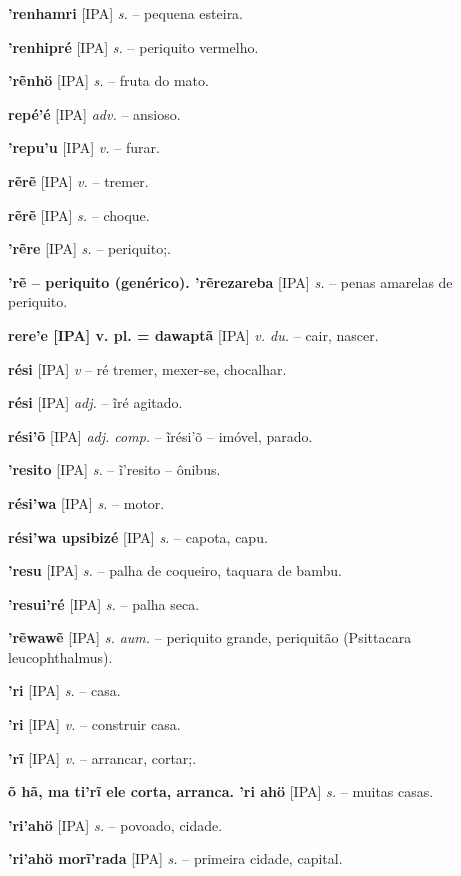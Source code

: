 \textbf{'renhamri} [IPA] \textit{s.} -- pequena esteira.

\textbf{'renhipré} [IPA] \textit{s.} -- periquito vermelho.

\textbf{'rẽnhö} [IPA] \textit{s.} -- fruta do mato.

\textbf{repé'é} [IPA] \textit{adv.} -- ansioso.

\textbf{'repu'u} [IPA] \textit{v.} -- furar.

\textbf{rẽrẽ} [IPA] \textit{v.} -- tremer.

\textbf{rẽrẽ} [IPA] \textit{s.} -- choque.

\textbf{'rẽre} [IPA] \textit{s.} -- periquito;.

\textbf{'rẽ -- periquito (genérico). 'rẽrezareba} [IPA] \textit{s.} -- penas amarelas de periquito.

\textbf{rere'e [IPA] v. pl. = dawaptã} [IPA] \textit{v. du.} -- cair, nascer.

\textbf{rési} [IPA] \textit{v} -- ré tremer, mexer-se, chocalhar.

\textbf{rési} [IPA] \textit{adj.} -- ĩré agitado.

\textbf{rési'õ} [IPA] \textit{adj. comp.} -- ĩrési'õ -- imóvel, parado.

\textbf{'resito} [IPA] \textit{s.} -- ĩ'resito -- ônibus.

\textbf{rési'wa} [IPA] \textit{s.} -- motor.

\textbf{rési'wa upsibizé} [IPA] \textit{s.} -- capota, capu.

\textbf{'resu} [IPA] \textit{s.} -- palha de coqueiro, taquara de bambu.

\textbf{'resui'ré} [IPA] \textit{s.} -- palha seca.

\textbf{'rẽwawẽ} [IPA] \textit{s. aum.} -- periquito grande, periquitão (Psittacara leucophthalmus).

\textbf{'ri} [IPA] \textit{s.} -- casa. \href{https://xavante.pythonanywhere.com/static/dicionario/play.html?file=house.wav}{\faHeadphones}

\textbf{'ri} [IPA] \textit{v.} -- construir casa.

\textbf{'rĩ} [IPA] \textit{v.} -- arrancar, cortar;.

\textbf{õ hã, ma ti'rĩ ele corta, arranca. 'ri ahö} [IPA] \textit{s.} -- muitas casas.

\textbf{'ri'ahö} [IPA] \textit{s.} -- povoado, cidade.

\textbf{'ri'ahö morĩ'rada} [IPA] \textit{s.} -- primeira cidade, capital.

